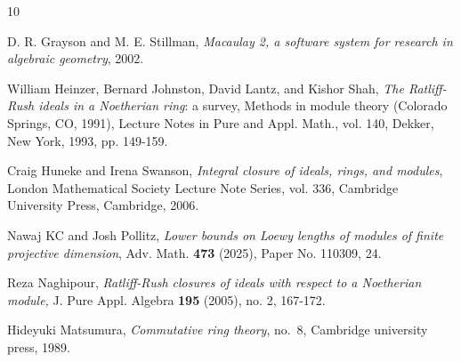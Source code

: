 \documentclass[11pt]{amsart}
\theoremstyle{plain}
\theoremstyle{plain}
\begin{document}
%
%
\providecommand{\bysame}{\leavevmode\hbox to3em{\hrulefill}\thinspace}
\providecommand{\MR}{\relax\ifhmode\unskip\space\fi MR }
\providecommand{\MRhref}[2]{
  \href{http://www.ams.org/mathscinet-getitem?mr=#1}{#2}
}
\begin{thebibliography}{10}




D. R. Grayson and M. E. Stillman, \emph{Macaulay 2, a software system for research in algebraic geometry}, 2002.

William Heinzer, Bernard Johnston, David Lantz, and Kishor Shah, \emph{The Ratliff-Rush ideals in a
Noetherian ring}: a survey, Methods in module theory (Colorado Springs, CO, 1991), Lecture Notes in Pure and Appl. Math., vol. 140, Dekker, New York, 1993, pp. 149-159.

Craig Huneke and Irena Swanson, \emph{Integral closure of ideals, rings, and modules}, London Mathematical Society Lecture Note Series, vol. 336, Cambridge University Press, Cambridge, 2006. 

Nawaj KC and Josh Pollitz, \emph{Lower bounds on Loewy lengths of modules of finite projective dimension}, Adv. Math. \textbf{473} (2025), Paper No. 110309, 24.









Reza Naghipour, \emph{Ratliff-Rush closures of ideals with respect to a Noetherian module,} J. Pure Appl. Algebra \textbf{195} (2005), no. 2, 167-172.


Hideyuki Matsumura, \emph{Commutative ring theory}, no.~8, Cambridge university press, 1989.


\end{thebibliography}
\end{document}
